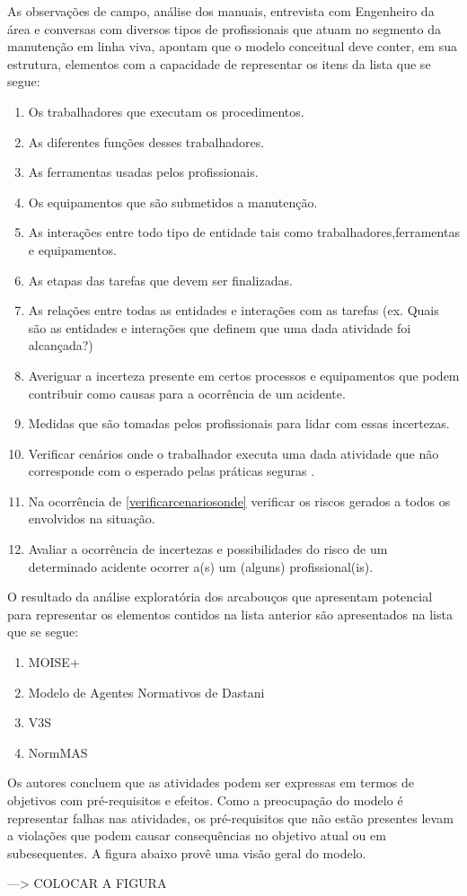 As observações de campo, análise dos manuais, entrevista com Engenheiro da área e conversas com diversos tipos de profissionais que atuam no segmento da manutenção em linha viva, apontam que o modelo conceitual deve conter, em sua estrutura, elementos com a capacidade de representar os itens da lista que se segue:

\begin{enumerate}
	\item Os trabalhadores que executam os procedimentos.
	\item As diferentes funções desses trabalhadores.
	\item As ferramentas usadas pelos profissionais.
	\item Os equipamentos que são submetidos a manutenção.
	\item As interações entre todo tipo de entidade tais como trabalhadores,ferramentas e equipamentos.
	\item As etapas das tarefas que devem ser finalizadas. 
	\item As relações entre todas as entidades e interações com as tarefas (ex. Quais são as entidades e interações que definem que uma dada atividade foi alcançada?)
	\item Averiguar a incerteza presente em certos processos e equipamentos que podem contribuir como causas para a ocorrência de um acidente.
	\item Medidas que são tomadas pelos profissionais para lidar com essas incertezas.
	\item Verificar cenários onde o trabalhador executa uma dada atividade que não corresponde com o esperado pelas práticas seguras \label{verificarcenariosonde}. 
	\item Na ocorrência de \ref{verificarcenariosonde} verificar os riscos gerados a todos os envolvidos na situação.
	\item Avaliar a ocorrência de incertezas e possibilidades do risco de um determinado acidente ocorrer a(s) um (alguns) profissional(is).
\end{enumerate}

O resultado da análise exploratória dos arcabouços que apresentam potencial para representar os elementos contidos na lista anterior são apresentados na lista que se segue:

\begin{enumerate}
	\item MOISE+ 
	\item Modelo de Agentes Normativos de Dastani
	\item V3S
	\item NormMAS
\end{enumerate}

Os autores concluem que as atividades podem ser expressas em termos de objetivos com pré-requisitos e efeitos. Como a preocupação do modelo é representar falhas nas atividades, os pré-requisitos que não estão presentes levam a violações que podem causar consequências no objetivo atual ou em subesequentes. A figura abaixo provê uma visão geral do modelo. 

---> COLOCAR A FIGURA